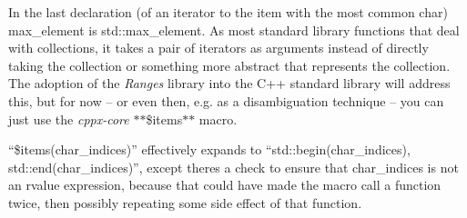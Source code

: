 In the last declaration (of an iterator to the item with the most common {\ttfamily char}) {\ttfamily max\+\_\+element} is {\ttfamily std\+::max\+\_\+element}. As most standard library functions that deal with collections, it takes a pair of iterators as arguments instead of directly taking the collection or something more abstract that represents the collection. The adoption of the {\itshape Ranges} library into the C++ standard library will address this, but for now – or even then, e.\+g. as a disambiguation technique – you can just use the {\itshape cppx-\/core} $\ast$$\ast${\ttfamily \$items}$\ast$$\ast$ macro.

“{\ttfamily \$items(char\+\_\+indices)}” effectively expands to “{\ttfamily std\+::begin(char\+\_\+indices),} {\ttfamily std\+::end(char\+\_\+indices)}”, except there\textquotesingle{}s a check to ensure that {\ttfamily char\+\_\+indices} is not an rvalue expression, because that could have made the macro call a function twice, then possibly repeating some side effect of that function. 
